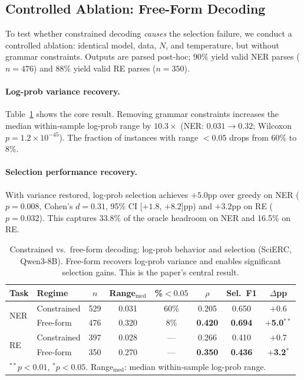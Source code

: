 \documentclass[11pt,a4paper]{article}
\newcommand{\bmark}[1]{\textbf{#1}}
\begin{document}
\subsection{Controlled Ablation: Free-Form Decoding}
\label{sec:freeform}

To test whether constrained decoding \emph{causes} the selection failure, we conduct a controlled ablation: identical model, data, $N$, and temperature, but without grammar constraints. Outputs are parsed post-hoc; 90\% yield valid NER parses ($n = 476$) and 88\% yield valid RE parses ($n = 350$).

\paragraph{Log-prob variance recovery.}
Table~\ref{tab:freeform_main} shows the core result. Removing grammar constraints increases the median within-sample log-prob range by $10.3\times$ (NER: $0.031 \to 0.32$; Wilcoxon $p = 1.2 \times 10^{-45}$). The fraction of instances with range $< 0.05$ drops from 60\% to 8\%.

\paragraph{Selection performance recovery.}
With variance restored, log-prob selection achieves $+5.0$pp over greedy on NER ($p = 0.008$, Cohen's $d = 0.31$, 95\% CI [$+1.8$, $+8.2$]pp) and $+3.2$pp on RE ($p = 0.032$). This captures 33.8\% of the oracle headroom on NER and 16.5\% on RE.

\begin{table}[t]
\centering
\caption{Constrained vs.\ free-form decoding: log-prob behavior and selection (SciERC, Qwen3-8B). Free-form recovers log-prob variance and enables significant selection gains. This is the paper's central result.}
\label{tab:freeform_main}
\small
\begin{tabular}{ll cccccc}
\toprule
Task & Regime & $n$ & Range$_{\text{med}}$ & \%${<}0.05$ & $\rho$ & Sel.\ F1 & $\Delta$pp \\
\midrule
\multirow{2}{*}{NER}
& Constrained & 529 & 0.031 & 60\% & 0.205 & 0.650 & $+$0.6 \\
& Free-form   & 476 & 0.320 & 8\%  & \bmark{0.420} & \bmark{0.694} & $+$\bmark{5.0}$^{**}$ \\
\midrule
\multirow{2}{*}{RE}
& Constrained & 397 & 0.028 & --- & 0.266 & 0.410 & $+$0.7 \\
& Free-form   & 350 & 0.270 & --- & \bmark{0.350} & \bmark{0.436} & $+$\bmark{3.2}$^{*}$ \\
\bottomrule
\multicolumn{8}{l}{\small $^{**}p < 0.01$, $^{*}p < 0.05$. Range$_{\text{med}}$: median within-sample log-prob range.} \\
\end{tabular}
\end{table}
\end{document}
